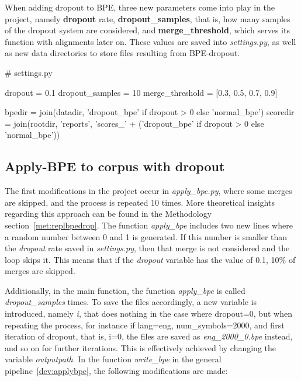 When adding dropout to BPE, three new parameters come into play in the project, namely \textbf{dropout} rate, \textbf{dropout\_samples}, that is, how many samples of the dropout system are considered, and \textbf{merge\_threshold}, which serves its function with alignments later on. These values are saved into \emph{settings.py}, as well as new data directories to store files resulting from BPE-dropout.

\begin{python}
# settings.py

dropout = 0.1
dropout_samples = 10
merge_threshold = [0.3, 0.5, 0.7, 0.9]

bpedir = join(datadir, 'dropout_bpe' if dropout > 0 else 'normal_bpe')
scoredir = join(rootdir, 'reports', 'scores_' + ('dropout_bpe' if dropout > 0 else 'normal_bpe'))
\end{python}

\subsection{Apply-BPE to corpus with dropout}

The first modifications in the project occur in \emph{apply\_bpe.py}, where some merges are skipped, and the process is repeated 10 times. More theoretical insights regarding this approach can be found in the Methodology section~\ref{met:replbpedrop}. The function \emph{apply\_bpe} includes two new lines where a random number between 0 and 1 is generated. If this number is smaller than the \emph{dropout} rate saved in \emph{settings.py}, then that merge is not considered and the loop skips it. This means that if the \emph{dropout} variable has the value of 0.1, 10\% of merges are skipped.

Additionally, in the main function, the function \emph{apply\_bpe} is called \emph{dropout\_samples} times. To save the files accordingly, a new variable is introduced, namely \emph{i}, that does nothing in the case where dropout=0, but when repeating the process, for instance if lang=eng, num\_symbols=2000, and first iteration of dropout, that is, i=0, the files are saved as \emph{eng\_2000\_0.bpe} instead, and so on for further iterations. This is effectively achieved by changing the variable \emph{outputpath}. In the function \emph{write\_bpe} in the general pipeline~\ref{dev:applybpe}, the following modifications are made:

